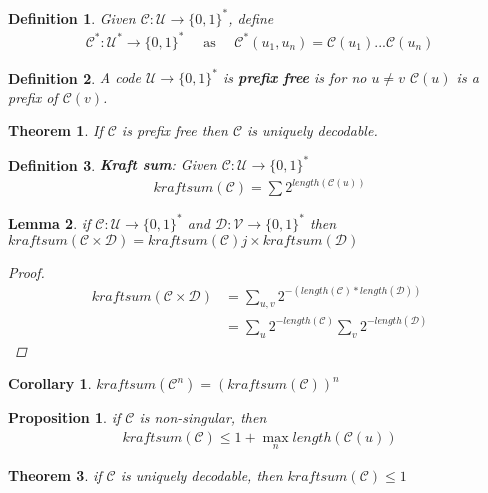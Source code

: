 \documentclass{article}
\newtheorem{theorem}{Theorem}[section]
\newtheorem{corollary}{Corollary}[theorem]
\newtheorem{lemma}[theorem]{Lemma}
\newtheorem{definition}{Definition}[section]
\newtheorem{proposition}{Proposition}[section]
\def\D{\mathcal{D}}
\def\V{\mathcal{V}}
\def\U{\mathcal{U}}
\def\C{\mathcal{C}}
\begin{document}
\begin{definition}
	Given $\C : \U \rightarrow \{ 0, 1\}^*$, define
	\begin{align*}
		\C^* : \U^* \rightarrow \{0, 1\}^* 
		\quad \text{ as } \quad
		\C^*(u_1, u_n) = \C(u_1)...\C(u_n)
	\end{align*}
\end{definition}

\begin{definition}
	A code $\U \rightarrow \{0, 1\}^*$ is \textbf{prefix free} is for no $u \neq v$ $\C(u)$ is a prefix of $\C(v)$.
\end{definition}

\begin{theorem}
	If $\C$ is prefix free then $\C$ is uniquely decodable.
\end{theorem}


\begin{definition}
	\textbf{Kraft sum}: Given $\C : \U \rightarrow \{ 0, 1\}^*$
	\begin{align*}
		kraftsum(\C) = \sum 2^{length(\C(u))}
	\end{align*}
\end{definition}

\begin{lemma}
	if $\C : \U \rightarrow \{ 0, 1\}^*$ and $\D : \V \rightarrow \{ 0, 1\}^*$
	then $kraftsum(\C \times \D) = kraftsum(\C)j \times kraftsum(\D)$
	\begin{proof}
    \begin{align*}
      kraftsum(\C \times \D) &= \sum_{u, v} 2^{-(length(\C) * length(\D))} \\
      &= \sum_u 2^{-length(\C)} \sum_v 2^{- length(\D)}
    \end{align*}
	\end{proof}
\end{lemma}

\begin{corollary}
  $kraftsum(\C^n) = (kraftsum(\C))^n$
\end{corollary}

\begin{proposition}
  if $\C$ is non-singular, then 
  \begin{align*}
    kraftsum(\C) \leq 1 + \max_n length(\C(u))
  \end{align*}
\end{proposition}

\begin{theorem}
  if $\C$ is uniquely decodable, then $kraftsum(\C) \leq 1$
\end{theorem}
\end{document}
